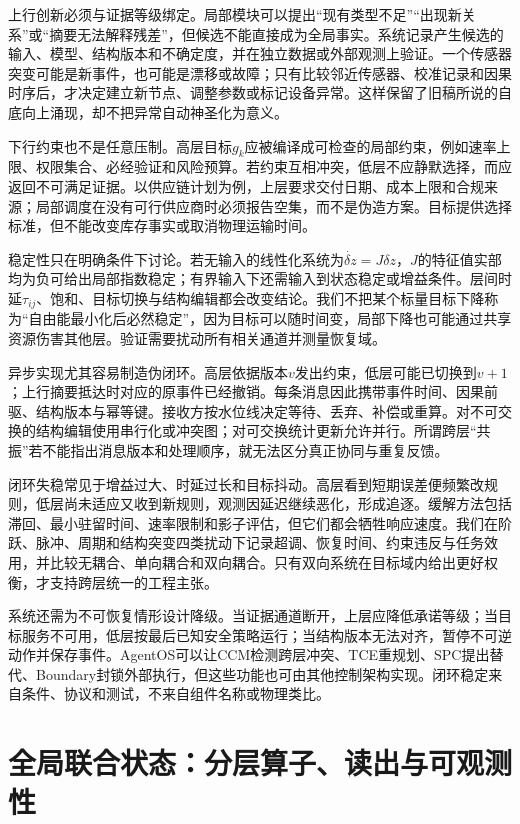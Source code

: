 上行创新必须与证据等级绑定。局部模块可以提出“现有类型不足”“出现新关系”或“摘要无法解释残差”，但候选不能直接成为全局事实。系统记录产生候选的输入、模型、结构版本和不确定度，并在独立数据或外部观测上验证。一个传感器突变可能是新事件，也可能是漂移或故障；只有比较邻近传感器、校准记录和因果时序后，才决定建立新节点、调整参数或标记设备异常。这样保留了旧稿所说的自底向上涌现，却不把异常自动神圣化为意义。

下行约束也不是任意压制。高层目标$g_k$应被编译成可检查的局部约束，例如速率上限、权限集合、必经验证和风险预算。若约束互相冲突，低层不应静默选择，而应返回不可满足证据。以供应链计划为例，上层要求交付日期、成本上限和合规来源；局部调度在没有可行供应商时必须报告空集，而不是伪造方案。目标提供选择标准，但不能改变库存事实或取消物理运输时间。

稳定性只在明确条件下讨论。若无输入的线性化系统为$\dot{\delta z}=J\delta z$，$J$的特征值实部均为负可给出局部指数稳定；有界输入下还需输入到状态稳定或增益条件。层间时延$\tau_{ij}$、饱和、目标切换与结构编辑都会改变结论。我们不把某个标量目标下降称为“自由能最小化后必然稳定”，因为目标可以随时间变，局部下降也可能通过共享资源伤害其他层。验证需要扰动所有相关通道并测量恢复域。

异步实现尤其容易制造伪闭环。高层依据版本$v$发出约束，低层可能已切换到$v+1$；上行摘要抵达时对应的原事件已经撤销。每条消息因此携带事件时间、因果前驱、结构版本与幂等键。接收方按水位线决定等待、丢弃、补偿或重算。对不可交换的结构编辑使用串行化或冲突图；对可交换统计更新允许并行。所谓跨层“共振”若不能指出消息版本和处理顺序，就无法区分真正协同与重复反馈。

闭环失稳常见于增益过大、时延过长和目标抖动。高层看到短期误差便频繁改规则，低层尚未适应又收到新规则，观测因延迟继续恶化，形成追逐。缓解方法包括滞回、最小驻留时间、速率限制和影子评估，但它们都会牺牲响应速度。我们在阶跃、脉冲、周期和结构突变四类扰动下记录超调、恢复时间、约束违反与任务效用，并比较无耦合、单向耦合和双向耦合。只有双向系统在目标域内给出更好权衡，才支持跨层统一的工程主张。

系统还需为不可恢复情形设计降级。当证据通道断开，上层应降低承诺等级；当目标服务不可用，低层按最后已知安全策略运行；当结构版本无法对齐，暂停不可逆动作并保存事件。AgentOS可以让CCM检测跨层冲突、TCE重规划、SPC提出替代、Boundary封锁外部执行，但这些功能也可由其他控制架构实现。闭环稳定来自条件、协议和测试，不来自组件名称或物理类比。

\section{全局联合状态：分层算子、读出与可观测性}
\label{sec:holographic_unification}

